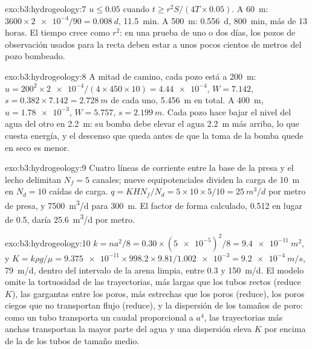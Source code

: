 \begin{solution}{exo:b3:hydrogeology:7}
$u \le 0.05$ cuando $t \ge r^2S/(4T\times0.05)$. A \qty{60}{m}: $3600\times
\num{2e-4}/90 = \qty{0.008}{d}$, \qty{11.5}{min}. A \qty{500}{m}:
\qty{0.556}{d}, \qty{800}{min}, más de 13 horas. El tiempo crece como $r^2$:
en una prueba de uno o dos días, los pozos de observación usados para la
recta deben estar a unos pocos cientos de metros del pozo bombeado.
\end{solution}

\begin{solution}{exo:b3:hydrogeology:8}
A mitad de camino, cada pozo está a \qty{200}{m}: $u = 200^2\times\num{2e-4}/(4
\times450\times10) = \num{4.44e-4}$, $W = \num{7.142}$, $s = 0.382\times
7.142 = \qty{2.728}{m}$ de cada uno, \qty{5.456}{m} en total. A
\qty{400}{m}, $u = \num{1.78e-3}$, $W = \num{5.757}$, $s =
\qty{2.199}{m}$. Cada pozo hace bajar el nivel del agua del otro en
\qty{2.2}{m}: su bomba debe elevar el agua \qty{2.2}{m} más arriba, lo que
cuesta energía, y el descenso que queda antes de que la toma de la bomba quede en seco
es menor.
\end{solution}

\begin{solution}{exo:b3:hydrogeology:9}
Cuatro líneas de corriente entre la base de la presa y el lecho delimitan $N_f = 5$
canales; nueve equipotenciales dividen la carga de \qty{10}{m} en $N_d = 10$
caídas de carga. $q = KHN_f/N_d = 5\times10\times5/10 = \qty{25}{m^3/d}$ por metro
de presa, y \qty{7500}{m^3/d} para \qty{300}{m}. El factor de forma
calculado, 0.512 en lugar de 0.5, daría \qty{25.6}{m^3/d} por metro.
\end{solution}

\begin{solution}{exo:b3:hydrogeology:10}
$k = na^2/8 = 0.30\times(\num{5e-5})^2/8 = \qty{9.4e-11}{m^2}$, y $K =
k\rho g/\mu = \num{9.375e-11}\times998.2\times9.81/\num{1.002e-3} =
\qty{9.2e-4}{m/s}$, \qty{79}{m/d}, dentro del intervalo de la arena limpia, entre 0.3
y \qty{150}{m/d}. El modelo omite la tortuosidad de las trayectorias, más largas
que los tubos rectos (reduce $K$), las gargantas entre los poros,
más estrechas que los poros (reduce), los poros ciegos que no
transportan flujo (reduce), y la dispersión de los tamaños de poro: como un tubo transporta un
caudal proporcional a $a^4$, las trayectorias más anchas transportan la mayor parte del agua y
una dispersión eleva $K$ por encima de la de los tubos de tamaño medio.
\end{solution}

